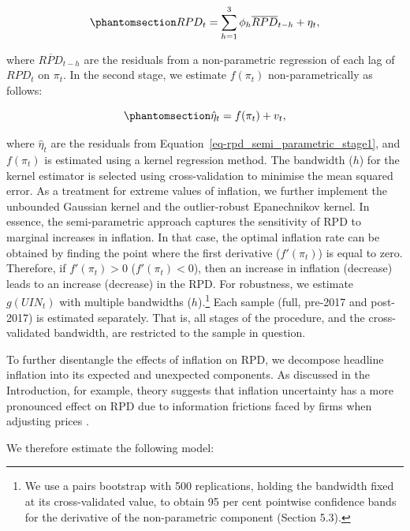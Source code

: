\documentclass[
  letterpaper,
  DIV=11,
  numbers=noendperiod]{scrartcl}
\begin{document}
\begin{equation}\phantomsection\label{eq-rpd_semi_parametric_stage1}{ RPD_t = \sum_{h=1}^{3}\phi_h\overline{RPD}_{t-h} + \eta_t, }\end{equation}

where \(\overline{RPD}_{t-h}\) are the residuals from a non-parametric
regression of each lag of \(RPD_t\) on \(\pi_t\). In the second stage,
we estimate \(f(\pi_t)\) non-parametrically as follows:

\begin{equation}\phantomsection\label{eq-rpd_semi_parametric_stage2}{\hat{\eta}_t = f(\pi_t) + v_t, }\end{equation}

where \(\hat{\eta}_t\) are the residuals from
Equation~\ref{eq-rpd_semi_parametric_stage1}, and \(f(\pi_t)\) is
estimated using a kernel regression method. The bandwidth (\(h\)) for
the kernel estimator is selected using cross-validation to minimise the
mean squared error. As a treatment for extreme values of inflation, we
further implement the unbounded Gaussian kernel and the outlier-robust
Epanechnikov kernel. In essence, the semi-parametric approach captures
the sensitivity of RPD to marginal increases in inflation. In that case,
the optimal inflation rate can be obtained by finding the point where
the first derivative (\(f'(\pi_t)\)) is equal to zero. Therefore, if
\(f'(\pi_t) > 0\) (\(f'(\pi_t) < 0\)), then an increase in inflation
(decrease) leads to an increase (decrease) in the RPD. For robustness,
we estimate \(g(UIN_t)\) with multiple bandwidths (\(h\)).\footnote{We
  use a pairs bootstrap with 500 replications, holding the bandwidth
  fixed at its cross-validated value, to obtain 95 per cent pointwise
  confidence bands for the derivative of the non-parametric component
  (Section 5.3).} Each sample (full, pre-2017 and post-2017) is
estimated separately. That is, all stages of the \citet{robinson1988a}
procedure, and the cross-validated bandwidth, are restricted to the
sample in question.

To further disentangle the effects of inflation on RPD, we decompose
headline inflation into its expected and unexpected components. As
discussed in the Introduction, for example, theory suggests that
inflation uncertainty has a more pronounced effect on RPD due to
information frictions faced by firms when adjusting prices
\citep{lucas1973, hercowitz1981, cukierman1983}.

We therefore estimate the following model:
\end{document}
